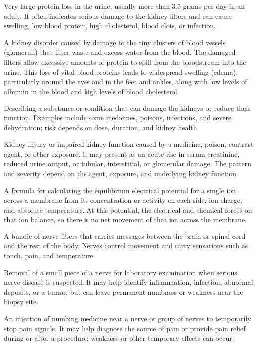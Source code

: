  Very large protein loss in the urine, usually more than 3.5 grams per day in an adult. It often indicates serious damage to the kidney filters and can cause swelling, low blood protein, high cholesterol, blood clots, or infection.

 A kidney disorder caused by damage to the tiny clusters of blood vessels (glomeruli) that filter waste and excess water from the blood. The damaged filters allow excessive amounts of protein to spill from the bloodstream into the urine. This loss of vital blood proteins leads to widespread swelling (edema), particularly around the eyes and in the feet and ankles, along with low levels of albumin in the blood and high levels of blood cholesterol.

 Describing a substance or condition that can damage the kidneys or reduce their function. Examples include some medicines, poisons, infections, and severe dehydration; risk depends on dose, duration, and kidney health.

 Kidney injury or impaired kidney function caused by a medicine, poison, contrast agent, or other exposure. It may present as an acute rise in serum creatinine, reduced urine output, or tubular, interstitial, or glomerular damage. The pattern and severity depend on the agent, exposure, and underlying kidney function.

 A formula for calculating the equilibrium electrical potential for a single ion across a membrane from its concentration or activity on each side, ion charge, and absolute temperature. At this potential, the electrical and chemical forces on that ion balance, so there is no net movement of that ion across the membrane.

 A bundle of nerve fibers that carries messages between the brain or spinal cord and the rest of the body. Nerves control movement and carry sensations such as touch, pain, and temperature.

 Removal of a small piece of a nerve for laboratory examination when serious nerve disease is suspected. It may help identify inflammation, infection, abnormal deposits, or a tumor, but can leave permanent numbness or weakness near the biopsy site.

 An injection of numbing medicine near a nerve or group of nerves to temporarily stop pain signals. It may help diagnose the source of pain or provide pain relief during or after a procedure; weakness or other temporary effects can occur.

